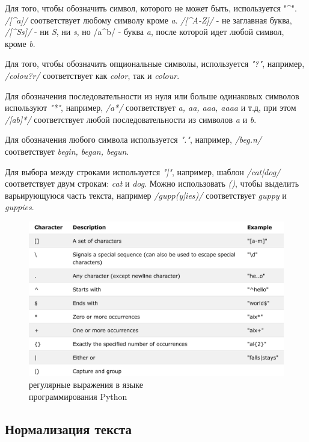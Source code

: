 \documentclass[a4paper,12pt,preview]{report} %
\begin{document}
	Для того, чтобы обозначить символ, которого не может быть, используется "\^{}". \textit{/[\^{}a]/} соответствует любому символу кроме \textit{a}. \textit{/[\^{}A-Z]/} - не заглавная буква, \textit{/[\^{}Ss]/} - ни \textit{S}, ни \textit{s}, но /a\^{}b/ - буква \textit{a}, после которой идет любой символ, кроме \textit{b}. 
	
	Для того, чтобы обозначить опциональные символы, используется \textit{"?"}, например, \textit{/colou?r/} соответствует как \textit{color}, так и \textit{colour}. 
	
	Для обозначения последовательности из
нуля или больше одинаковых символов используют \textit{"*"}, например, \textit{/a*/} соответствует \textit{a, aa, aaa, aaaa} и т.д, при этом \textit{/[ab]*/} соответствует любой последовательности из символов \textit{a} и \textit{b}.

	Для обозначения любого символа используется \textit{"."}, например, \textit{/beg.n/} соответствует \textit{begin, began, begun}.
	
	Для выбора между строками используется \textit{"|"}, например, шаблон \textit{/cat|dog/} соответствует двум строкам: \textit{cat} и \textit{dog}. Можно использовать \textit{()}, чтобы выделить варьирующуюся часть текста, например \textit{/gupp(y|ies)/} соответствует \textit{guppy} и \textit{guppies}. 
	
	
	
	
		
	\begin{figure}[H]
		\centering\includegraphics[scale=0.2]{regex.png}
		\caption{регулярные выражения в языке \\ программирования Python}
		\label{fig:regex}
	\end{figure}
	
	
	\subsection{Нормализация текста}
	
\end{document}
